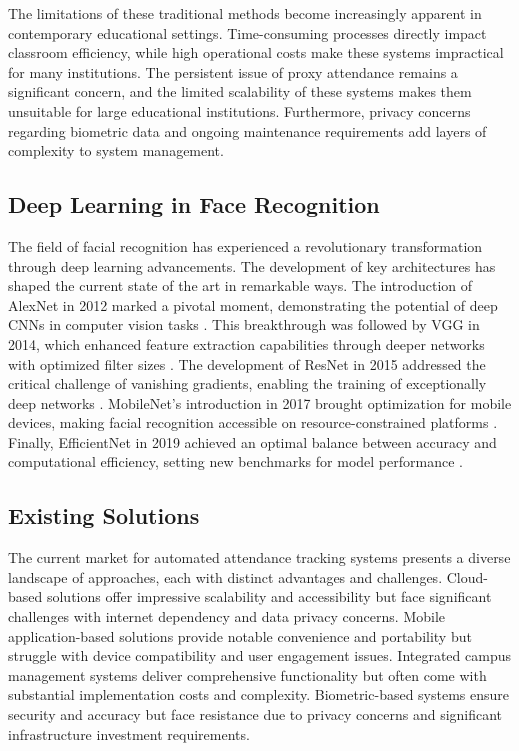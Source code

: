 \documentclass[conference]{IEEEtran}
\begin{document}
The limitations of these traditional methods become increasingly apparent in contemporary educational settings. Time-consuming processes directly impact classroom efficiency, while high operational costs make these systems impractical for many institutions. The persistent issue of proxy attendance remains a significant concern, and the limited scalability of these systems makes them unsuitable for large educational institutions. Furthermore, privacy concerns regarding biometric data and ongoing maintenance requirements add layers of complexity to system management.

\subsection{Deep Learning in Face Recognition}
The field of facial recognition has experienced a revolutionary transformation through deep learning advancements. The development of key architectures has shaped the current state of the art in remarkable ways. The introduction of AlexNet in 2012 marked a pivotal moment, demonstrating the potential of deep CNNs in computer vision tasks \cite{b4}. This breakthrough was followed by VGG in 2014, which enhanced feature extraction capabilities through deeper networks with optimized filter sizes \cite{b5}. The development of ResNet in 2015 addressed the critical challenge of vanishing gradients, enabling the training of exceptionally deep networks \cite{b3}. MobileNet's introduction in 2017 brought optimization for mobile devices, making facial recognition accessible on resource-constrained platforms \cite{b1}. Finally, EfficientNet in 2019 achieved an optimal balance between accuracy and computational efficiency, setting new benchmarks for model performance \cite{b9}.

\subsection{Existing Solutions}
The current market for automated attendance tracking systems presents a diverse landscape of approaches, each with distinct advantages and challenges. Cloud-based solutions offer impressive scalability and accessibility but face significant challenges with internet dependency and data privacy concerns. Mobile application-based solutions provide notable convenience and portability but struggle with device compatibility and user engagement issues. Integrated campus management systems deliver comprehensive functionality but often come with substantial implementation costs and complexity. Biometric-based systems ensure security and accuracy but face resistance due to privacy concerns and significant infrastructure investment requirements.
\end{document}
